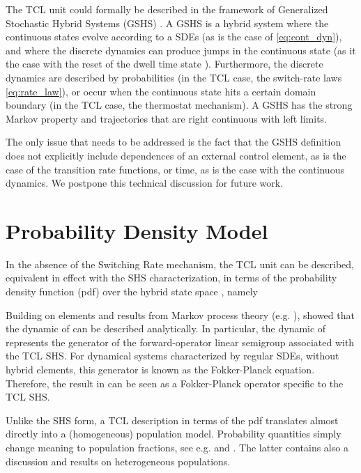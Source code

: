 \documentclass[submission,copyright,creativecommons]{eptcs}
\begin{document}
The TCL unit could formally be described in the framework of Generalized Stochastic Hybrid Systems (GSHS) \cite{bujorianu2006toward}.
A GSHS is a hybrid system where the continuous states evolve according to a SDEs (as is the case of \eqref{eq:cont_dyn}), 
and where the discrete dynamics can produce jumps in the continuous state (as it the case with the reset of the dwell time state ).
Furthermore, the discrete dynamics are described by probabilities (in the TCL case, the switch-rate laws \eqref{eq:rate_law}), 
or occur when the continuous state hits a certain domain boundary (in the TCL case, the thermostat mechanism). 
A GSHS has the strong Markov property and trajectories that are right continuous with left limits.

The only issue that needs to be addressed is the fact that the GSHS definition does not explicitly include dependences of an external control element, 
as is the case of the transition rate functions, or time, as is the case with the continuous dynamics. We postpone this technical discussion for future work.

\section{Probability Density Model}  \label{sec:pde_models}

In the absence of the Switching Rate mechanism, the TCL unit can be described, equivalent in effect with the SHS characterization,
in terms of the probability density function (pdf) over the hybrid state space , namely
 
Building on elements and results from Markov process theory (e.g. \cite{dynkin1965markov,gardiner1985handbook}), \cite{malhame1985electric} showed that the dynamic of  can be described analytically. In particular, the dynamic of   represents the generator of the forward-operator linear semigroup associated with the TCL  SHS. For dynamical systems characterized by regular SDEs, without hybrid elements, this generator is known as the Fokker-Planck equation. Therefore, the result in \cite{malhame1985electric} can be seen as a Fokker-Planck operator specific to the TCL SHS.

Unlike the SHS form, a TCL description in terms of the pdf translates almost directly into a (homogeneous) population model.  Probability quantities simply change meaning to  population fractions, see e.g. \cite{malhame1985electric} and \cite{totu2014demand}. The latter contains also a discussion and results on heterogeneous populations.
\end{document}
